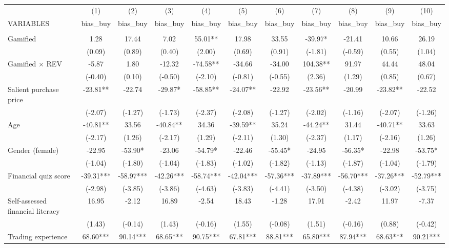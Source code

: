 \documentclass[]{article}
\begin{document}
\begin{tabular}{lcccccccccc} \hline
 & (1) & (2) & (3) & (4) & (5) & (6) & (7) & (8) & (9) & (10) \\
VARIABLES & bias\_buy & bias\_buy & bias\_buy & bias\_buy & bias\_buy & bias\_buy & bias\_buy & bias\_buy & bias\_buy & bias\_buy \\ \hline
 &  &  &  &  &  &  &  &  &  &  \\
Gamified & 1.28 & 17.44 & 7.02 & 55.01** & 17.98 & 33.55 & -39.97* & -21.41 & 10.66 & 26.19 \\
 & (0.09) & (0.89) & (0.40) & (2.00) & (0.69) & (0.91) & (-1.81) & (-0.59) & (0.55) & (1.04) \\
Gamified $\times$ REV & -5.87 & 1.80 & -12.32 & -74.58** & -34.66 & -34.00 & 104.38** & 91.97 & 44.44 & 48.04 \\
 & (-0.40) & (0.10) & (-0.50) & (-2.10) & (-0.81) & (-0.55) & (2.36) & (1.29) & (0.85) & (0.67) \\
Salient purchase price & -23.81** & -22.74 & -29.87* & -58.85** & -24.07** & -22.92 & -23.56** & -20.99 & -23.82** & -22.52 \\
 & (-2.07) & (-1.27) & (-1.73) & (-2.37) & (-2.08) & (-1.27) & (-2.02) & (-1.16) & (-2.07) & (-1.26) \\
Age & -40.81** & 33.56 & -40.84** & 34.36 & -39.59** & 35.24 & -44.24** & 31.44 & -40.71** & 33.63 \\
 & (-2.17) & (1.26) & (-2.17) & (1.29) & (-2.11) & (1.30) & (-2.37) & (1.17) & (-2.16) & (1.26) \\
Gender (female) & -22.95 & -53.90* & -23.06 & -54.79* & -22.46 & -55.45* & -24.95 & -56.35* & -22.98 & -53.75* \\
 & (-1.04) & (-1.80) & (-1.04) & (-1.83) & (-1.02) & (-1.82) & (-1.13) & (-1.87) & (-1.04) & (-1.79) \\
Financial quiz score & -39.31*** & -58.97*** & -42.26*** & -58.74*** & -42.04*** & -57.36*** & -37.89*** & -56.70*** & -37.26*** & -52.79*** \\
 & (-2.98) & (-3.85) & (-3.86) & (-4.63) & (-3.83) & (-4.41) & (-3.50) & (-4.38) & (-3.02) & (-3.75) \\
Self-assessed financial literacy & 16.95 & -2.12 & 16.89 & -2.54 & 18.43 & -1.28 & 17.91 & -2.42 & 11.97 & -7.37 \\
 & (1.43) & (-0.14) & (1.43) & (-0.16) & (1.55) & (-0.08) & (1.51) & (-0.16) & (0.88) & (-0.42) \\
Trading experience & 68.60*** & 90.14*** & 68.65*** & 90.75*** & 67.81*** & 88.81*** & 65.80*** & 87.94*** & 68.63*** & 90.21*** \\

\end{tabular}
\end{document}
